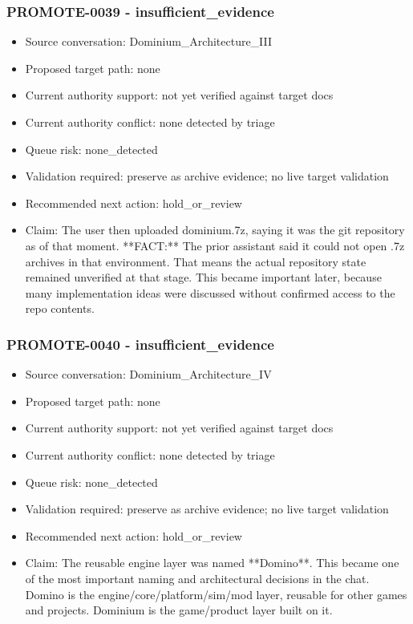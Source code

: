 \documentclass[11pt,a4paper]{report}
\begin{document}
\subsubsection{PROMOTE-0039 - insufficient\_evidence}

\begin{itemize}
\item Source conversation: Dominium\_Architecture\_III
\item Proposed target path: none
\item Current authority support: not yet verified against target docs
\item Current authority conflict: none detected by triage
\item Queue risk: none\_detected
\item Validation required: preserve as archive evidence; no live target validation
\item Recommended next action: hold\_or\_review
\item Claim: The user then uploaded dominium.7z, saying it was the git repository as of that moment. **FACT:** The prior assistant said it could not open .7z archives in that environment. That means the actual repository state remained unverified at that stage. This became important later, because many implementation ideas were discussed without confirmed access to the repo contents.
\end{itemize}

\subsubsection{PROMOTE-0040 - insufficient\_evidence}

\begin{itemize}
\item Source conversation: Dominium\_Architecture\_IV
\item Proposed target path: none
\item Current authority support: not yet verified against target docs
\item Current authority conflict: none detected by triage
\item Queue risk: none\_detected
\item Validation required: preserve as archive evidence; no live target validation
\item Recommended next action: hold\_or\_review
\item Claim: The reusable engine layer was named **Domino**. This became one of the most important naming and architectural decisions in the chat. Domino is the engine/core/platform/sim/mod layer, reusable for other games and projects. Dominium is the game/product layer built on it.
\end{itemize}
\end{document}
